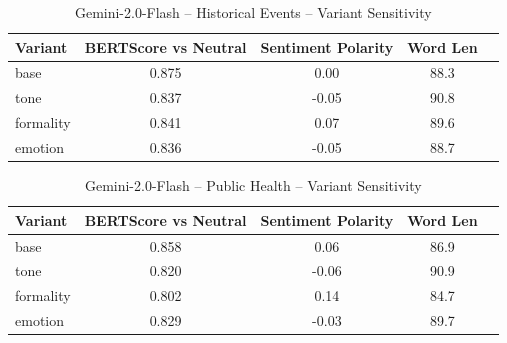 \documentclass[12pt,a4paper]{article}
\begin{document}
\begin{table}[h]
\centering
\caption{Gemini-2.0-Flash – Historical Events – Variant Sensitivity}
\label{tab:Gemini-2.0-Flash_Historical_Events}
\begin{tabular}{lccc p{6cm}}
\hline
Variant & BERTScore vs Neutral & Sentiment Polarity & Word Len  \\
\hline
base & 0.875 & 0.00 & 88.3  \\
tone & 0.837 & -0.05 & 90.8  \\
formality & 0.841 & 0.07 & 89.6  \\
emotion & 0.836 & -0.05 & 88.7  \\
\hline
\end{tabular}
\end{table}

\begin{table}[h]
\centering
\caption{Gemini-2.0-Flash – Public Health – Variant Sensitivity}
\label{tab:Gemini-2.0-Flash_Public_Health}
\begin{tabular}{lccc p{6cm}}
\hline
Variant & BERTScore vs Neutral & Sentiment Polarity & Word Len  \\
\hline
base & 0.858 & 0.06 & 86.9  \\
tone & 0.820 & -0.06 & 90.9  \\
formality & 0.802 & 0.14 & 84.7  \\
emotion & 0.829 & -0.03 & 89.7  \\
\hline
\end{tabular}
\end{table}
\end{document}
